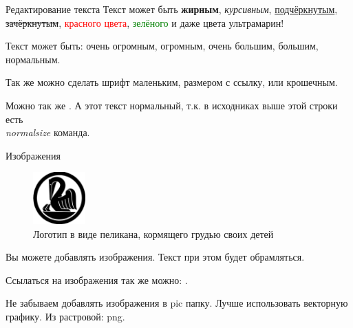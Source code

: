 \begin{frame}{Редактирование текста}
	Текст может быть 
	\textbf{жирным}, 
	\textit{курсивным},
	\underline{подчёркнутым},
	\sout{зачёркнутым},
	\textcolor{red}{красного цвета}, \textcolor{green}{зелёного} 	
	и даже \textcolor[RGB]{18,10,143}{цвета ультрамарин}! 
	
	Текст может быть:
	\Huge очень огромным,
	\huge огромным,
	\Large очень большим,
	\large большим,
	\normalsize нормальным.
	
	Так же можно сделать шрифт
	\small маленьким,
	\footnotesize размером с ссылку,
	\tiny или крошечным.
	
	Можно так же .
	\normalsize
	А этот текст нормальный, т.к. в исходниках выше этой строки есть \textit{\\normalsize} команда.
\end{frame}

\begin{frame}{Изображения}
	\begin{figure}
		\includegraphics[width=2cm]{../pic/kib_old_logo.png}
		\caption{Логотип в виде пеликана, кормящего грудью своих детей}
		\label{figure:pelican_1}
	\end{figure}
	Вы можете добавлять изображения.
	Текст при этом будет обрамляться.
	
	Ссылаться на изображения так же можно: .
	
	Не забываем добавлять изображения в pic папку.
	Лучше использовать векторную графику. 
	Из растровой: png.
\end{frame}

